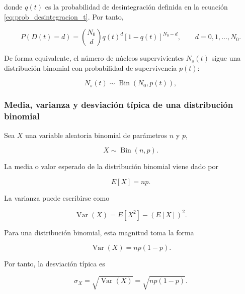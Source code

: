 \documentclass[12pt,a4paper]{article}
\begin{document}
donde $q(t)$ es la probabilidad de desintegración definida en la ecuación \eqref{eq:prob_desintegracion_t}. Por tanto,

\begin{equation}
    P(D(t)=d)
    =
    \binom{N_0}{d}
    q(t)^d
    \left[1-q(t)\right]^{N_0-d},
    \qquad d=0,1,\ldots,N_0.
    \label{eq:binomial_desintegrados}
\end{equation}

De forma equivalente, el número de núcleos supervivientes $N_s(t)$ sigue una distribución binomial con probabilidad de supervivencia $p(t)$:

\begin{equation}
    N_s(t)\sim \operatorname{Bin}(N_0,p(t)),
    \label{eq:supervivientes_binomial}
\end{equation}

\subsubsection{Media, varianza y desviación típica de una distribución binomial}
\label{sec:media_varianza_desviacion_binomial}

Sea $X$ una variable aleatoria binomial de parámetros $n$ y $p$,

\begin{equation}
    X\sim \operatorname{Bin}(n,p).
\end{equation}

La media o valor esperado de la distribución binomial viene dado por

\begin{equation}
    E[X]=np.
    \label{eq:media_distribucion_binomial}
\end{equation}

La varianza puede escribirse como

\begin{equation}
    \operatorname{Var}(X)=E[X^2]-\left(E[X]\right)^2.
\end{equation}

Para una distribución binomial, esta magnitud toma la forma

\begin{equation}
    \operatorname{Var}(X)=np(1-p).
    \label{eq:varianza_binomial}
\end{equation}

Por tanto, la desviación típica es

\begin{equation}
    \sigma_X=\sqrt{\operatorname{Var}(X)}=\sqrt{np(1-p)}.
    \label{eq:desviacion_tipica_binomial}
\end{equation}
\end{document}
